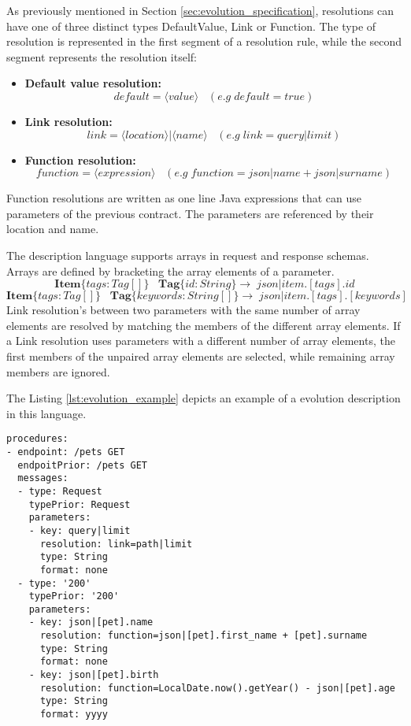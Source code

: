 As previously mentioned in Section \ref{sec:evolution_specification}, resolutions can have one of three distinct types DefaultValue, Link or Function.
The type of resolution is represented in the first segment of a resolution rule, while the second segment represents the resolution itself:

\begin{itemize}
    \item \textbf{Default value resolution:} \[ \mathit{default}=\langle value\rangle \;\;\;(e.g\;default=true) \]
    \item \textbf{Link resolution:} \[ \mathit{link}=\langle location\rangle|\langle name\rangle \;\;\;(e.g\;link=query|limit) \]
    \item \textbf{Function resolution:} \[ \mathit{function}=\langle expression\rangle \;\;\;(e.g\;function=json|name + json|surname) \]
\end{itemize}

Function resolutions are written as one line Java expressions that can use parameters of the previous contract. The
parameters are referenced by their location and name.

The description language supports arrays in request and response schemas.
Arrays are defined by bracketing the array elements of a parameter.
\[ \mathbf{Item}\bm{\{}tags:Tag[]\bm{\}}\;\;\;\mathbf{Tag}\bm{\{}id:String\bm{\}} \rightarrow \;json|item.[tags].id \]
\[ \mathbf{Item}\bm{\{}tags:Tag[]\bm{\}}\;\;\;\mathbf{Tag}\bm{\{}keywords:String[]\bm{\}} \rightarrow \;json|item.[tags].[keywords] \]
Link resolution's between two parameters with the same number of array elements are resolved by matching the members of the different array elements.
If a Link resolution uses parameters with a different number of array elements, the first members of the unpaired array elements are selected, while remaining array members are ignored.

The Listing \ref{lst:evolution_example} depicts an example of a evolution description in this language.

\begin{lstlisting}[caption=Evolution specification example, label=lst:evolution_example, captionpos=b]
procedures:
- endpoint: /pets GET
  endpoitPrior: /pets GET
  messages:
  - type: Request
    typePrior: Request
    parameters:
    - key: query|limit
      resolution: link=path|limit
      type: String
      format: none
  - type: '200'
    typePrior: '200'
    parameters:
    - key: json|[pet].name
      resolution: function=json|[pet].first_name + [pet].surname
      type: String
      format: none
    - key: json|[pet].birth
      resolution: function=LocalDate.now().getYear() - json|[pet].age
      type: String
      format: yyyy
\end{lstlisting}

